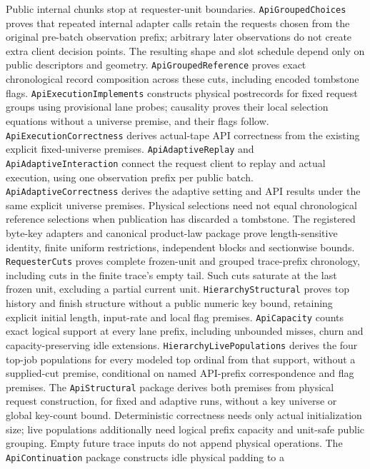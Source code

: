 \documentclass[11pt]{article}
\theoremstyle{definition}
\theoremstyle{remark}
\begin{document}
Public internal chunks stop at requester-unit boundaries.
\texttt{ApiGroupedChoices} proves that repeated internal adapter calls retain
the requests chosen from the original pre-batch observation prefix; arbitrary
later observations do not create extra client decision points. The resulting
shape and slot schedule depend only on public descriptors and geometry.
\texttt{ApiGroupedReference} proves exact chronological record composition
across these cuts, including encoded tombstone flags.
\texttt{ApiExecutionImplements} constructs physical postrecords for fixed
request groups using provisional lane probes; causality proves their local
selection equations without a universe premise, and their flags follow.
\texttt{ApiExecutionCorrectness} derives actual-tape API correctness from the
existing explicit fixed-universe premises. \texttt{ApiAdaptiveReplay} and
\texttt{ApiAdaptiveInteraction} connect the request client to replay and
actual execution, using one observation prefix per public batch.
\texttt{ApiAdaptiveCorrectness} derives the adaptive setting and API results
under the same explicit universe premises. Physical selections need not equal
chronological reference selections when publication has discarded a tombstone.
The registered byte-key adapters and canonical product-law package prove
length-sensitive identity, finite uniform restrictions, independent blocks
and sectionwise bounds. \texttt{RequesterCuts} proves complete frozen-unit
and grouped trace-prefix chronology, including cuts in the finite trace's
empty tail. Such cuts saturate at the last frozen unit, excluding a partial
current unit. \texttt{HierarchyStructural} proves top
history and finish structure without a public numeric key bound, retaining
explicit initial length, input-rate and local flag premises. \texttt{ApiCapacity}
counts exact logical support at every lane prefix, including unbounded misses,
churn and capacity-preserving idle extensions. \texttt{HierarchyLivePopulations}
derives the four top-job populations for every modeled top ordinal from that
support, without a supplied-cut premise,
conditional on named API-prefix correspondence and flag premises. The
\texttt{ApiStructural} package derives both premises from physical request
construction, for fixed and adaptive runs, without a key universe or global
key-count bound. Deterministic correctness needs only actual initialization
size; live populations additionally need logical prefix capacity and unit-safe
public grouping. Empty future trace inputs do not append physical operations.
The \texttt{ApiContinuation} package constructs idle physical padding to a
\end{document}
